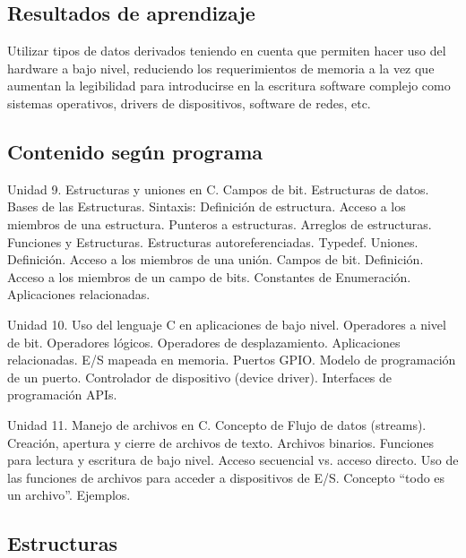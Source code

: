 \subsection*{Resultados de aprendizaje}
Utilizar tipos de datos derivados teniendo en cuenta que permiten hacer uso del hardware a bajo nivel, reduciendo los requerimientos de memoria a la vez que aumentan la legibilidad para introducirse en la escritura software complejo como sistemas operativos, drivers de dispositivos, software de redes, etc.

\subsection*{Contenido según programa}
Unidad 9. Estructuras y uniones en C. Campos de bit.  Estructuras de datos. Bases de las Estructuras. Sintaxis: Definición de estructura.  Acceso a los miembros de una estructura. Punteros a estructuras. Arreglos de estructuras. Funciones y Estructuras. Estructuras autoreferenciadas. Typedef.  Uniones. Definición. Acceso a los miembros de una unión. Campos de bit.  Definición. Acceso a los miembros de un campo de bits. Constantes de Enumeración. Aplicaciones relacionadas.

Unidad 10. Uso del lenguaje C en aplicaciones de bajo nivel.  Operadores a nivel de bit.  Operadores lógicos.  Operadores de desplazamiento.  Aplicaciones relacionadas.  E/S mapeada en memoria.  Puertos GPIO. Modelo de programación de un puerto.  Controlador de dispositivo (device driver). Interfaces de programación APIs.

Unidad 11. Manejo de archivos en C.  Concepto de Flujo de datos (streams). Creación, apertura y cierre de archivos de texto. Archivos binarios.  Funciones para lectura y escritura de bajo nivel.  Acceso secuencial vs.  acceso directo. Uso de las funciones de archivos para acceder a dispositivos de E/S. Concepto ``todo es un archivo''. Ejemplos.

\setcounter{subsection}{9}

\subsection*{Estructuras}

